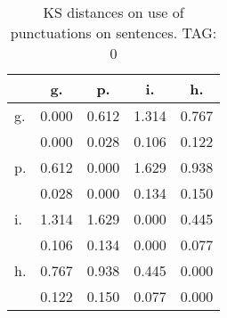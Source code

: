 \begin{table}[h!]
\begin{center}
\begin{tabular}{| l | c | c | c | c |}\hline
 & g. & p. & i. & h. \\\hline
g. & 0.000  & 0.612  & 1.314  & 0.767 \\\hline
 & 0.000  & 0.028  & 0.106  & 0.122 \\\hline
p. & 0.612  & 0.000  & 1.629  & 0.938 \\\hline
 & 0.028  & 0.000  & 0.134  & 0.150 \\\hline
i. & 1.314  & 1.629  & 0.000  & 0.445 \\\hline
 & 0.106  & 0.134  & 0.000  & 0.077 \\\hline
h. & 0.767  & 0.938  & 0.445  & 0.000 \\\hline
 & 0.122  & 0.150  & 0.077  & 0.000 \\\hline
\end{tabular}
\caption{KS distances on use of punctuations on sentences. TAG: 0}
\end{center}
\end{table}